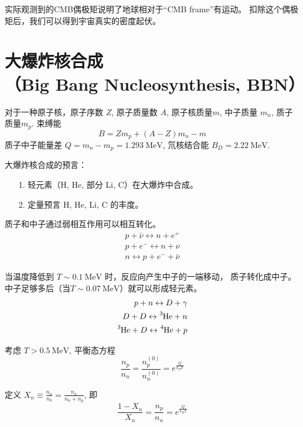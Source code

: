 \documentclass[12pt]{ctexart}
\begin{document}
实际观测到的CMB偶极矩说明了地球相对于“CMB frame”有运动。
扣除这个偶极矩后，我们可以得到宇宙真实的密度起伏。


\section{大爆炸核合成 \\（Big Bang Nucleosynthesis, BBN）}

对于一种原子核，原子序数 $Z$,
原子质量数 $A$, 原子核质量$m$, 中子质量 $m_n$, 质子质量$m_p$.
束缚能
\begin{equation}
    B=Z m_p + (A-Z) m_n -m
\end{equation}
质子中子能量差 $Q=m_n-m_p = 1.293 \mathrm{~MeV}$,
氘核结合能 $B_D = 2.22 \mathrm{~MeV} $.

大爆炸核合成的预言：
\begin{itemize}
    \item[1.] 轻元素（H, He, 部分 Li, C）在大爆炸中合成。
    \item[2.] 定量预言 H, He, Li, C 的丰度。
\end{itemize}

质子和中子通过弱相互作用可以相互转化。
\begin{eqnarray}
    p+\bar{\nu} \leftrightarrow n + e^+ \\ 
    p + e^- \leftrightarrow n + \nu \\ 
    n \leftrightarrow p + e^- + \bar{\nu}
\end{eqnarray}

当温度降低到 $T\sim 0.1 \mathrm{~MeV}$ 时，反应向产生中子的一端移动， 质子转化成中子。
中子足够多后（当$T\sim 0.07 \mathrm{~MeV}$）就可以形成轻元素。
\begin{eqnarray}
    p+n \leftrightarrow D + \gamma \\ 
    D + D \leftrightarrow \ce{^{3}He} + n \\ 
    \ce{^{3}He} + D \leftrightarrow \ce{^{4}He} + p  
\end{eqnarray}


考虑 $T > 0.5 \mathrm{~MeV}$,%
平衡态方程
\begin{equation}
    \frac{n_p}{n_n} = \frac{n_p^{(0)}}{n_n^{(0)}} = e^\frac{Q}{k_B T}
\end{equation}

定义
$X_n\equiv \frac{n_n}{n_b} = \frac{n_n}{n_n+n_p}$,
即
\begin{equation}
    \frac{1-X_n}{X_n} = \frac{n_p}{n_n} = e^\frac{Q}{k_B T}
\end{equation}
\end{document}
